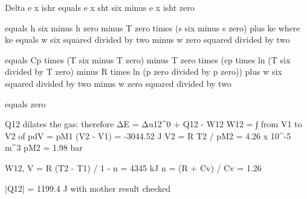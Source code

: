 Delta e x ishr equals e x sht six minus e x isht zero

equals h six minus h zero minus T zero times (s six minus s zero) plus ke where ke equals w six squared divided by two minus w zero squared divided by two

equals Cp times (T six minus T zero) minus T zero times (cp times ln (T six divided by T zero) minus R times ln (p zero divided by p zero)) plus w six squared divided by two minus w zero squared divided by two

equals zero

Q12 dilates the gas:  
therefore ΔE = Δu12^0 + Q12 - W12  
W12 = ∫ from V1 to V2 of pdV = pM1 (V2 - V1) = -3044.52 J  
V2 = R T2 / pM2 = 4.26 x 10^-5 m^3  
pM2 = 1.98 bar  

W12, V = R (T2 - T1) / 1 - n = 4345 kJ  
n = (R + Cv) / Cv = 1.26  

|Q12| = 1199.4 J with mother result checked